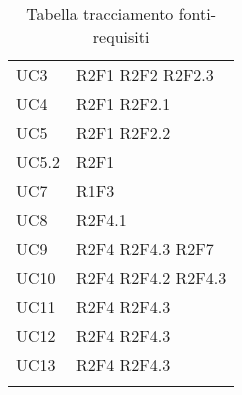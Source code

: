 \begin{center}
\begin{longtable}{  p{5cm} p{5cm} }
		UC3 & R2F1 \newline R2F2 \newline R2F2.3 \\
		UC4 & R2F1 \newline R2F2.1 \\
		UC5 & R2F1 \newline R2F2.2 \\
		UC5.2 & R2F1 \\
		UC7 & R1F3 \\
		UC8 & R2F4.1 \\
		UC9 & R2F4 \newline R2F4.3 \newline R2F7 \\
		UC10 & R2F4 \newline R2F4.2 \newline R2F4.3  \\
		UC11 & R2F4 \newline R2F4.3 \\
		UC12 & R2F4 \newline R2F4.3 \\
		UC13 & R2F4 \newline R2F4.3 \\
		\rowcolor{white}
		\caption{Tabella tracciamento fonti-requisiti}
	\end{longtable}
\end{center}
